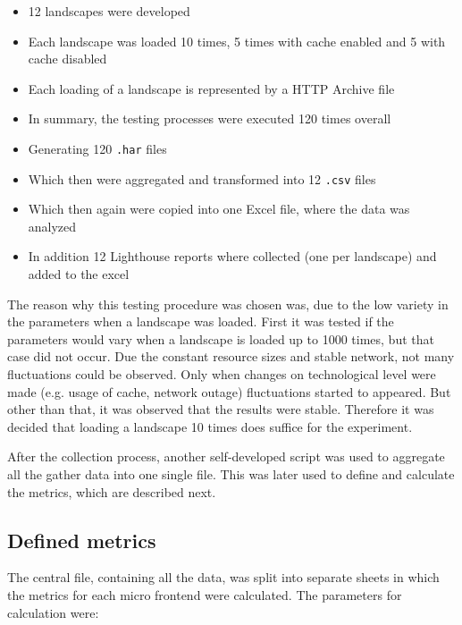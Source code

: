 \begin{itemize}[noitemsep]
	\item 12 landscapes were developed
	\item Each landscape was loaded 10 times, 5 times with cache enabled and 5 with cache disabled
	\item Each loading of a landscape is represented by a HTTP Archive file
	\item In summary, the testing processes were executed 120 times overall
	\item Generating 120 \texttt{.har} files
	\item Which then were aggregated and transformed into 12 \texttt{.csv} files
	\item Which then again were copied into one Excel file, where the data was analyzed
	\item In addition 12 Lighthouse reports where collected (one per landscape) and added to the excel
\end{itemize}

The reason why this testing procedure was chosen was, due to the low variety in the parameters when a landscape was loaded. First it was tested if the parameters would vary when a landscape is loaded up to 1000 times, but that case did not occur. Due the constant resource sizes and stable network, not many fluctuations could be observed. Only when changes on technological level were made (e.g. usage of cache, network outage) fluctuations started to appeared. But other than that, it was observed that the results were stable. Therefore it was decided that loading a landscape 10 times does suffice for the experiment.

After the collection process, another self-developed script was used to aggregate all the gather data into one single file. This was later used to define and calculate the metrics, which are described next.

\subsection{Defined metrics}

The central file, containing all the data, was split into separate sheets in which the metrics for each micro frontend were calculated. The parameters for calculation were:

